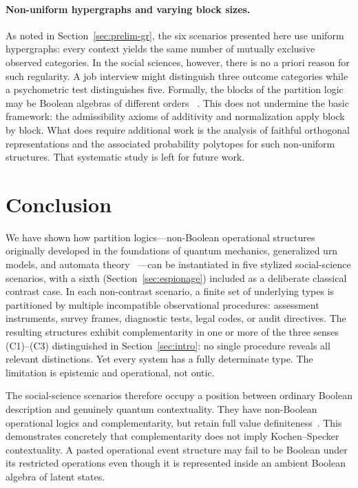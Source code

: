 \documentclass[aps,pra,twocolumn,superscriptaddress,floatfix,longbibliography]{revtex4-2}
\begin{document}
\paragraph{Non-uniform hypergraphs and varying block sizes.}
As noted in Section~\ref{sec:prelim-gr}, the six scenarios presented
here use uniform hypergraphs: every context yields the same number of
mutually exclusive observed categories. In the social sciences,
however, there is no a priori reason for such regularity. A job
interview might distinguish three outcome categories while a
psychometric test distinguishes five. Formally, the blocks of the
partition logic may be Boolean algebras of different orders
~\cite{greechie:71}. This does not undermine the basic framework:
the admissibility axioms of additivity and normalization apply block
by block. What does require additional work is the analysis of
faithful orthogonal representations and the associated probability
polytopes for such non-uniform structures. That systematic study is
left for future work.

\section{Conclusion}
\label{sec:conclusion}

We have shown how partition logics---non-Boolean operational
structures originally developed in the foundations of quantum
mechanics, generalized urn models, and automata theory
~\cite{svozil-2001-eua}---can be instantiated in five stylized
social-science scenarios, with a sixth (Section~\ref{sec:espionage})
included as a deliberate classical contrast case. In each
non-contrast scenario, a finite set of underlying types is
partitioned by multiple incompatible observational procedures:
assessment instruments, survey frames, diagnostic tests, legal
codes, or audit directives. The resulting structures exhibit
complementarity in one or more of the three senses (C1)--(C3)
distinguished in Section~\ref{sec:intro}: no single procedure
reveals all relevant distinctions. Yet every system has a fully
determinate type. The limitation is epistemic and operational, not
ontic.

The social-science scenarios therefore occupy a position between
ordinary Boolean description and genuinely quantum contextuality.
They have non-Boolean operational logics and complementarity, but
retain full value definiteness~\cite{svozil-2018-b}. This
demonstrates concretely that complementarity does not imply
Kochen--Specker contextuality. A pasted operational event structure
may fail to be Boolean under its restricted operations even though it
is represented inside an ambient Boolean algebra of latent states.
\end{document}
